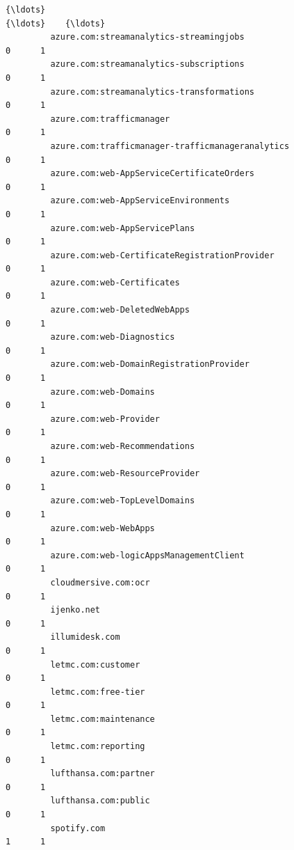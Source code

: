 \documentclass[11pt]{article}
\begin{document}
\begin{Verbatim}[commandchars=\\\{\}]
         {\ldots}                                                        {\ldots}    {\ldots}   
         azure.com:streamanalytics-streamingjobs                      0      1   
         azure.com:streamanalytics-subscriptions                      0      1   
         azure.com:streamanalytics-transformations                    0      1   
         azure.com:trafficmanager                                     0      1   
         azure.com:trafficmanager-trafficmanageranalytics             0      1   
         azure.com:web-AppServiceCertificateOrders                    0      1   
         azure.com:web-AppServiceEnvironments                         0      1   
         azure.com:web-AppServicePlans                                0      1   
         azure.com:web-CertificateRegistrationProvider                0      1   
         azure.com:web-Certificates                                   0      1   
         azure.com:web-DeletedWebApps                                 0      1   
         azure.com:web-Diagnostics                                    0      1   
         azure.com:web-DomainRegistrationProvider                     0      1   
         azure.com:web-Domains                                        0      1   
         azure.com:web-Provider                                       0      1   
         azure.com:web-Recommendations                                0      1   
         azure.com:web-ResourceProvider                               0      1   
         azure.com:web-TopLevelDomains                                0      1   
         azure.com:web-WebApps                                        0      1   
         azure.com:web-logicAppsManagementClient                      0      1   
         cloudmersive.com:ocr                                         0      1   
         ijenko.net                                                   0      1   
         illumidesk.com                                               0      1   
         letmc.com:customer                                           0      1   
         letmc.com:free-tier                                          0      1   
         letmc.com:maintenance                                        0      1   
         letmc.com:reporting                                          0      1   
         lufthansa.com:partner                                        0      1   
         lufthansa.com:public                                         0      1   
         spotify.com                                                  1      1   
         

\end{Verbatim}
\end{document}
